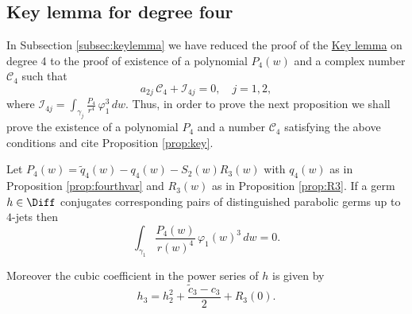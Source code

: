 \subsection{Key lemma for degree four}



In Subsection \ref{subsec:keylemma} we have reduced the proof of the \hyperref[lemma:key]{Key lemma} on degree 4 to the proof of existence of a polynomial $P_4(w)$ and a complex number $\mathcal{C}_4$ such that
\[ a_{2j}\,\mathcal{C}_4+\mathcal{I}_{4j}=0, \quad j=1,2, \]
where $\mathcal{I}_{4j}=\int_{\gamma_j}\frac{P_4}{r^4}\,\varphi_1^{3}\,dw$. Thus, in order to prove the next proposition we shall prove the existence of a polynomial $P_4$ and a number $\mathcal{C}_4$ satisfying the above conditions and cite Proposition \ref{prop:key}.

\begin{proposition}\label{prop:key4}
Let $P_4(w)=\tilde{q}_4(w)-q_4(w)-S_2(w)R_3(w)$ with $q_4(w)$ as in Proposition \textnormal{\ref{prop:fourthvar}} and $R_3(w)$ as in Proposition \textnormal{\ref{prop:R3}}. If a germ $h\in\Diff$ conjugates corresponding pairs of distinguished parabolic germs up to $4$-jets then
\[ \int_{\gamma_1}\frac{P_4(w)}{r(w)^4}\,\varphi_1(w)^3\,dw=0. \]

Moreover the cubic coefficient in the power series of $h$ is given by
\begin{equation}\label{eq:h3}
 h_3=h_2^2+\frac{\tilde{c}_3-c_3}{2}+R_3(0). 
\end{equation}
\end{proposition}

